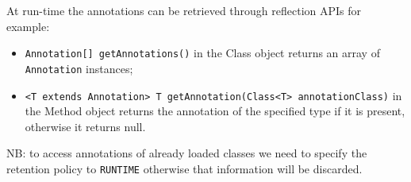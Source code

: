 At run-time the annotations can be retrieved through reflection APIs for example:
\begin{itemize}
    \item \verb|Annotation[] getAnnotations()| in the Class object returns an array of \verb|Annotation| instances;
    \item \verb|<T extends Annotation> T getAnnotation(Class<T> annotationClass)| in the Method object returns the annotation of the specified type if it is present, otherwise it returns null.
\end{itemize}

NB: to access annotations of already loaded classes  we need to specify the retention policy to \verb|RUNTIME| otherwise that information will be discarded. 

